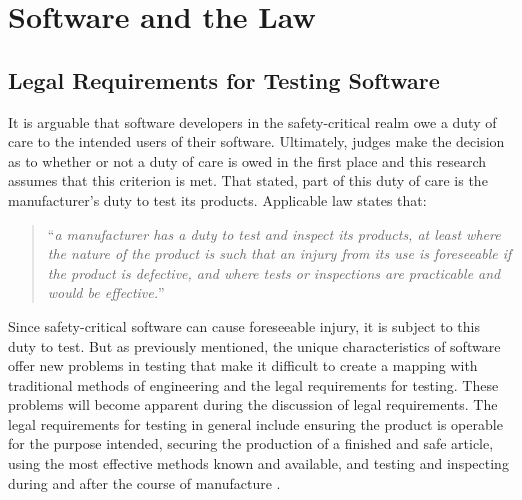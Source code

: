 \chapter{Software and the Law}\label{C:Software}

\section{Legal Requirements for Testing Software}

It is arguable that software developers in the safety-critical realm owe a duty
of care to the intended users of their software. Ultimately, judges make the
decision as to whether or not a duty of care is owed in the first place
\cite{Dobbs01} and this research assumes that this criterion is met. That
stated, part of this duty of care is the manufacturer's duty to test its
products. Applicable law states that:

\begin{quote}
``\textit{a manufacturer has a duty to test and inspect its products, at least
where the nature of the product is such that an injury from its use is 
foreseeable if the product is defective, and where tests or inspections are 
practicable and would be effective.}'' \cite{Testing2005}
\end{quote}

Since safety-critical software can cause foreseeable injury, it is subject to
this duty to test. But as previously mentioned, the unique characteristics of
software offer new problems in testing that make it difficult to create a
mapping with traditional methods of engineering and the legal requirements for
testing. These problems will become apparent during the discussion of legal
requirements. The legal requirements for testing in general include ensuring the
product is operable for the purpose intended, securing the production of a
finished and safe article, using the most effective methods known and available,
and testing and inspecting during and after the course of manufacture
\cite{Testing2005}.

